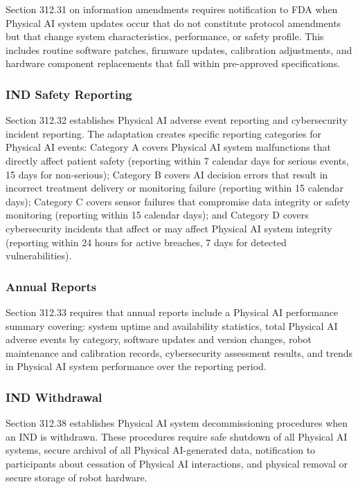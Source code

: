 Section 312.31 on information amendments requires notification to FDA when
Physical AI system updates occur that do not constitute protocol amendments but
that change system characteristics, performance, or safety profile. This
includes routine software patches, firmware updates, calibration adjustments,
and hardware component replacements that fall within pre-approved specifications.

\subsubsection{IND Safety Reporting}

Section 312.32 establishes Physical AI adverse event reporting and cybersecurity
incident reporting. The adaptation creates specific reporting categories for
Physical AI events: Category A covers Physical AI system malfunctions that
directly affect patient safety (reporting within 7 calendar days for serious
events, 15 days for non-serious); Category B covers AI decision errors that
result in incorrect treatment delivery or monitoring failure (reporting within
15 calendar days); Category C covers sensor failures that compromise data
integrity or safety monitoring (reporting within 15 calendar days); and
Category D covers cybersecurity incidents that affect or may affect Physical AI
system integrity (reporting within 24 hours for active breaches, 7 days for
detected vulnerabilities).

\subsubsection{Annual Reports}

Section 312.33 requires that annual reports include a Physical AI performance
summary covering: system uptime and availability statistics, total Physical AI
adverse events by category, software updates and version changes, robot
maintenance and calibration records, cybersecurity assessment results, and
trends in Physical AI system performance over the reporting period.

\subsubsection{IND Withdrawal}

Section 312.38 establishes Physical AI system decommissioning procedures when
an IND is withdrawn. These procedures require safe shutdown of all Physical AI
systems, secure archival of all Physical AI-generated data, notification to
participants about cessation of Physical AI interactions, and physical removal
or secure storage of robot hardware.

